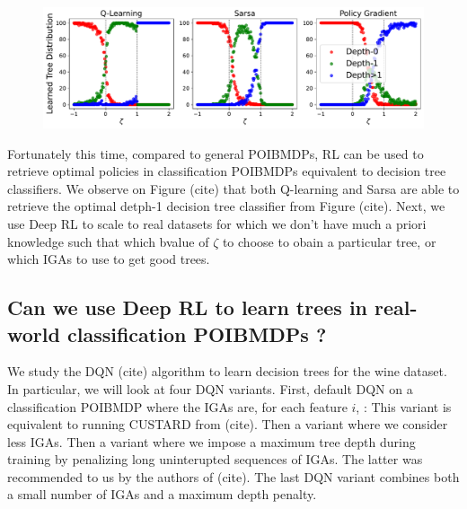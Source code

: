 \begin{figure}
    \centering
    \includegraphics[width=1\textwidth]{images/images_part1/tree_distributions_classif.pdf}
    \caption{}\label{fig:tree-distrib-classif-poibmdp}
\end{figure}

Fortunately this time, compared to general POIBMDPs, RL can be used to retrieve optimal policies in classification POIBMDPs equivalent to decision tree classifiers.
We observe on Figure (cite) that both Q-learning and Sarsa are able to retrieve the optimal detph-1 decision tree classifier from Figure (cite).
Next, we use Deep RL to scale to real datasets for which we don't have much a priori knowledge such that which bvalue of $\zeta$ to choose to obain a particular tree, or which IGAs to use to get good trees.

\subsection{Can we use Deep RL to learn trees in real-world classification POIBMDPs ?}

We study the DQN (cite) algorithm to learn decision trees for the wine dataset.
In particular, we will look at four DQN variants.
First, default DQN on a classification POIBMDP where the IGAs are, for each feature $i$, :
This variant is equivalent to running CUSTARD from (cite).
Then a variant where we consider less IGAs.
Then a variant where we impose a maximum tree depth during training by penalizing long uninterupted sequences of IGAs.
The latter was recommended to us by the authors of (cite).
The last DQN variant combines both a small number of IGAs and a maximum depth penalty.

